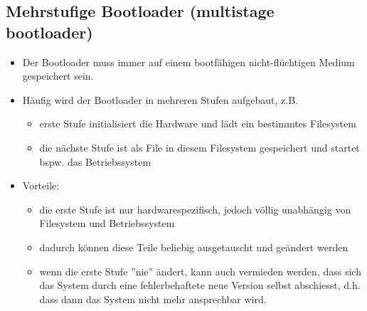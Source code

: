 \subsection{Mehrstufige Bootloader (multistage bootloader)}
\begin{itemize}
  \item Der Bootloader muss immer auf einem bootfähigen nicht-flüchtigen Medium gespeichert sein.
  \item Häufig wird der Bootloader in mehreren Stufen aufgebaut, z.B.
  \begin{itemize}
    \item erste Stufe initialisiert die Hardware und lädt ein bestimmtes Filesystem
    \item die nächste Stufe ist als File in diesem Filesystem gespeichert und startet bspw. das Betriebssystem
  \end{itemize}
  \item Vorteile:
  \begin{itemize}
    \item die erste Stufe ist nur hardwarespezifisch, jedoch völlig unabhängig von Filesystem und Betriebssystem
    \item dadurch können diese Teile beliebig ausgetauscht und geändert werden
    \item wenn die erste Stufe ''nie'' ändert, kann auch vermieden werden, dass sich das System durch eine fehlerbehaftete neue Version selbst abschiesst, d.h. dass dann das System nicht mehr ansprechbar wird.
  \end{itemize}
\end{itemize}

\pagebreak %

